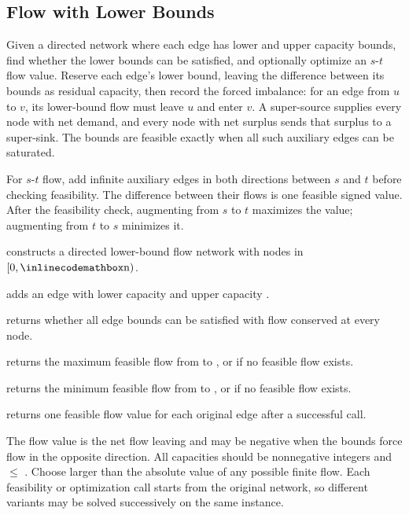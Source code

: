 \subsection{Flow with Lower Bounds}
\label{sec:4.5.5}
Given a directed network where each edge has lower and upper capacity bounds, find whether the lower bounds can be satisfied, and optionally optimize an $s$-$t$ flow value. Reserve each edge's lower bound, leaving the difference between its bounds as residual capacity, then record the forced imbalance: for an edge from $u$ to $v$, its lower-bound flow must leave $u$ and enter $v$. A super-source supplies every node with net demand, and every node with net surplus sends that surplus to a super-sink. The bounds are feasible exactly when all such auxiliary edges can be saturated.

For $s$-$t$ flow, add infinite auxiliary edges in both directions between $s$ and $t$ before checking feasibility. The difference between their flows is one feasible signed value. After the feasibility check, augmenting from $s$ to $t$ maximizes the value; augmenting from $t$ to $s$ minimizes it.

\begin{compactitem}
  \item {} constructs a directed lower-bound flow network with nodes in $[0, {\inlinecodemath{n}})$.
  \item {} adds an edge with lower capacity  and upper capacity .
  \item {} returns whether all edge bounds can be satisfied with flow conserved at every node.
  \item {} returns the maximum feasible flow from  to , or  if no feasible flow exists.
  \item {} returns the minimum feasible flow from  to , or  if no feasible flow exists.
  \item {} returns one feasible flow value for each original edge after a successful call.
\end{compactitem}

The flow value is the net flow leaving  and may be negative when the bounds force flow in the opposite direction. All capacities should be nonnegative integers and  $\leq$ . Choose  larger than the absolute value of any possible finite flow. Each feasibility or optimization call starts from the original network, so different variants may be solved successively on the same instance.

